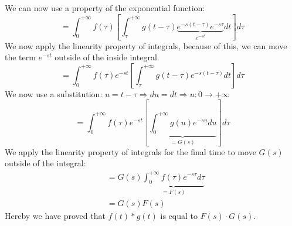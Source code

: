 \documentclass[]{subfiles}
\begin{document}
	We can now use a property of the exponential function:
	\begin{equation}
		=\int_{0}^{+\infty}f(\tau)\left[ \int_{\tau}^{+\infty}g(t-\tau)\underbrace{e^{-s(t-\tau)}e^{-s\tau}}_{e^{-st}}dt\right]d\tau 
	\end{equation}
	We now apply the linearity property of integrals, because of this, we can move the term $e^{-st}$ outside of the inside integral.
	\begin{equation}
		=\int_{0}^{+\infty}f(\tau)e^{-st}\left[ \int_{\tau}^{+\infty}g(t-\tau)e^{-s(t-\tau)}dt\right] d\tau
	\end{equation}%
	\newpage%
	We now use a substitution: $u = t-\tau  \Rightarrow du = dt \Rightarrow u: 0\rightarrow+\infty$
	\begin{equation}
		=\int_{0}^{+\infty}f(\tau)e^{-st}\left[ \underbrace{\int_{0}^{+\infty}g(u)e^{-su}du}_{=G(s)}\right] d\tau
	\end{equation}
	We apply the linearity property of integrals for the final time to move $G(s)$ outside of the integral:
	\begin{align}
		&=G(s)\underbrace{\int_{0}^{+\infty}f(\tau)e^{-s\tau}d\tau}_{=F(s)}\\
		&=G(s)F(s)
	\end{align}
	Hereby we have proved that $f(t)\ast g(t)$ is equal to $F(s)\cdot G(s)$.
\end{document}
